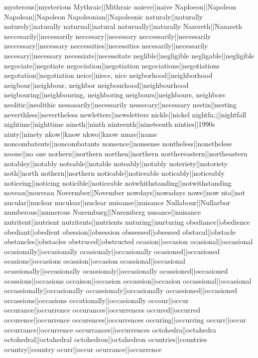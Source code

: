 mysterous||mysterious
Mythraic||Mithraic
naieve||naive
Naploeon||Napoleon
Napolean||Napoleon
Napoleonian||Napoleonic
naturaly||naturally
naturely||naturally
naturual||natural
naturually||naturally
Nazereth||Nazareth
neccesarily||necessarily
neccesary||necessary
neccessarily||necessarily
neccessary||necessary
neccessities||necessities
necesarily||necessarily
necesary||necessary
necessiate||necessitate
neglible||negligible
negligable||negligible
negociate||negotiate
negociation||negotiation
negociations||negotiations
negotation||negotiation
neice||niece, nice
neigborhood||neighborhood
neigbour||neighbour, neighbor
neigbourhood||neighbourhood
neigbouring||neighbouring, neighboring
neigbours||neighbours, neighbors
neolitic||neolithic
nessasarily||necessarily
nessecary||necessary
nestin||nesting
neverthless||nevertheless
newletters||newsletters
nickle||nickel
nightfa;;||nightfall
nightime||nighttime
nineth||ninth
ninteenth||nineteenth
ninties||1990s
ninty||ninety
nkow||know
nkwo||know
nmae||name
noncombatents||noncombatants
nonsence||nonsense
nontheless||nonetheless
noone||no one
norhern||northern
northen||northern
northereastern||northeastern
notabley||notably
noteable||notable
noteably||notably
noteriety||notoriety
noth||north
nothern||northern
noticable||noticeable
noticably||noticeably
noticeing||noticing
noticible||noticeable
notwhithstanding||notwithstanding
noveau||nouveau
Novermber||November
nowdays||nowadays
nowe||now
nto||not
nucular||nuclear
nuculear||nuclear
nuisanse||nuisance
Nullabour||Nullarbor
numberous||numerous
Nuremburg||Nuremberg
nusance||nuisance
nutritent||nutrient
nutritents||nutrients
nuturing||nurturing
obediance||obedience
obediant||obedient
obession||obsession
obssessed||obsessed
obstacal||obstacle
obstancles||obstacles
obstruced||obstructed
ocasion||occasion
ocasional||occasional
ocasionally||occasionally
ocasionaly||occasionally
ocasioned||occasioned
ocasions||occasions
ocassion||occasion
ocassional||occasional
ocassionally||occasionally
ocassionaly||occasionally
ocassioned||occasioned
ocassions||occasions
occaison||occasion
occassion||occasion
occassional||occasional
occassionally||occasionally
occassionaly||occasionally
occassioned||occasioned
occassions||occasions
occationally||occasionally
occour||occur
occurance||occurrence
occurances||occurrences
occured||occurred
occurence||occurrence
occurences||occurrences
occuring||occurring
occurr||occur
occurrance||occurrence
occurrances||occurrences
octohedra||octahedra
octohedral||octahedral
octohedron||octahedron
ocuntries||countries
ocuntry||country
ocurr||occur
ocurrance||occurrence
